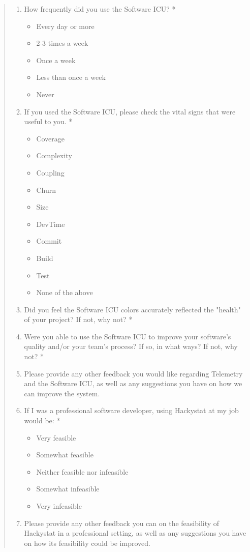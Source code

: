 \documentclass[11pt]{article}
\begin{document}
\begin{quote}
\begin{enumerate}
\item How frequently did you use the Software ICU? *
\begin{itemize}
\item Every day or more
\item 2-3 times a week
\item Once a week
\item Less than once a week
\item Never
\end{itemize}

\item If you used the Software ICU, please check the vital signs that were useful to you. *
\begin{itemize}
\item Coverage
\item Complexity
\item Coupling
\item Churn
\item Size
\item DevTime
\item Commit
\item Build
\item Test
\item None of the above
\end{itemize}

\item Did you feel the Software ICU colors accurately reflected the "health" of your project? If not, why not? *

\item Were you able to use the Software ICU to improve your software's quality and/or your team's process? If so, in what ways? If not, why not? *

\item Please provide any other feedback you would like regarding Telemetry and the Software ICU, as well as any suggestions you have on how we can improve the system.

\item If I was a professional software developer, using Hackystat at my job would be: *
\begin{itemize}
\item Very feasible
\item Somewhat feasible
\item Neither feasible nor infeasible
\item Somewhat infeasible
\item Very infeasible
\end{itemize}

\item Please provide any other feedback you can on the feasibility of Hackystat in a professional setting, as well as any suggestions you have on how its feasibility could be improved. 

\end{enumerate}

\end{quote}
\end{document}
